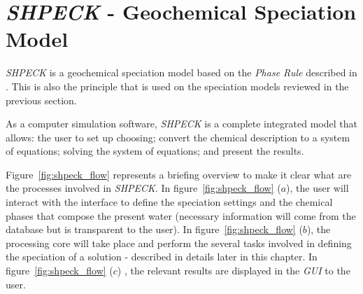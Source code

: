 
\chapter{\emph{SHPECK} - Geochemical Speciation Model}
\label{chapter:SHPECK}

\emph{SHPECK} is a geochemical speciation model based on the \emph{Phase Rule} described in \cite{Garrels:65}. This is also the principle that is used on the speciation models reviewed in the previous section. 

As a computer simulation software, \emph{SHPECK} is a complete integrated model that allows: the user to set up choosing; convert the chemical description to a system of equations; solving the system of equations; and present the results.

Figure~\ref{fig:shpeck_flow} represents a briefing overview to make it clear what are the processes involved in \emph{SHPECK}. In figure~\ref{fig:shpeck_flow} ($a$), the user will interact with the interface to define the speciation settings and the chemical phases that compose the present water (necessary information will come from the database but is transparent to the user). In figure~\ref{fig:shpeck_flow} ($b$), the processing core will take place and perform the several tasks involved in defining the speciation of a solution - described in details later in this chapter. In figure~\ref{fig:shpeck_flow} ($c$) , the relevant results are displayed in the \emph{GUI} to the user.

